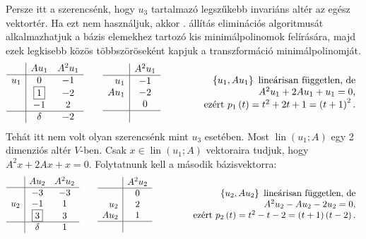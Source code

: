\documentclass[a4paper, showtrims]{memoir}
\theoremstyle{plain}
\theoremstyle{remark}
\theoremstyle{definition}
\DeclareMathOperator{\lin}{lin}
\begin{document}
Persze itt a szerencsénk, hogy $u_3$ tartalmazó legszűkebb invariáns altér az egész vektortér.
Ha ezt nem használjuk, 
akkor . állítás eliminációs algoritmusát alkalmazhatjuk a bázis elemekhez tartozó kis minimálpolinomok felírására, 
majd ezek legkisebb közös többszöröseként kapjuk a transzformáció minimálpolinomját.
\[
		\begin{array}{r|cc}
			    & Au_1          & A^2u_1 \\
			\hline
			u_1 &  0            &-1      \\
			    & \framebox{1}  &-2      \\
			    & -1            & 2      \\
			\hline
			    & \delta        &-2
		\end{array}
		\qquad
		\begin{array}{r|c}
			     & A^2u_1 \\
			\hline
			u_1  & -1     \\
			Au_1 & -2     \\
			     & 0      \\
			\hline
			     &
		\end{array}
		\qquad\qquad
		\begin{array}{r}
			\left\{ u_1,Au_1 \right\}\mbox{ lineárisan független, de} \\
			A^2u_1+2Au_1+u_1=0,                                        \\
			\mbox{ezért } p_1\left( t \right)=t^2+2t+1=\left( t+1 \right)^2.
		\end{array}
\]
Tehát itt nem volt olyan szerencsénk mint $u_3$ esetében.
Most $\lin\left( u_1;A \right)$ egy 2 dimenziós altér $V$-ben.
Csak $x\in\lin\left( u_1;A \right)$ vektoraira tudjuk, hogy $A^2x+2Ax+x=0$.
Folytatnunk kell a második bázisvektorra:
\[
		\begin{array}{r|cc}
			    & Au_2          & A^2u_2 \\
			\hline
			    & -3            &-3      \\
		   u_2  & -1            & 1      \\
                & \framebox{3}  & 3      \\
			\hline
			    & \delta        & 1
		\end{array}
		\qquad
		\begin{array}{r|c}
			     & A^2u_2 \\
			\hline
			     &  0     \\
			 u_2 &  2     \\
			Au_2 &  1     \\
			\hline
			     &
		\end{array}
		\qquad\qquad
		\begin{array}{r}
			\left\{ u_2,Au_2 \right\}\mbox{ lineárisan független, de} \\
			A^2u_2-Au_2-2u_2=0,                                        \\
			\mbox{ezért } p_2\left( t \right)=t^2-t-2=\left( t+1 \right)\left( t-2 \right).
		\end{array}
\]
\end{document}
